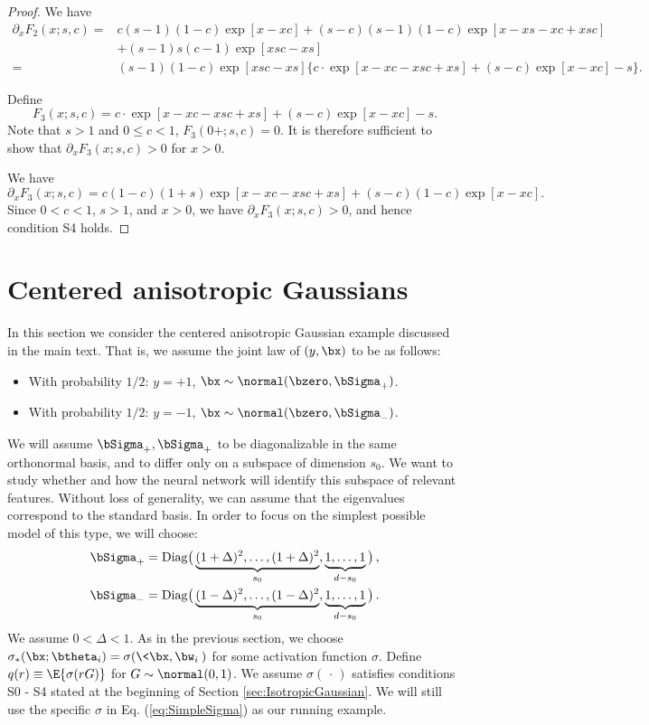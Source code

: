 \documentclass[11pt]{article}
\begin{document}
\begin{proof}
We have 
\[
\begin{aligned}
\partial_x F_2(x; s, c) =& c(s - 1)(1 - c) \exp[x - xc] + (s - c) (s - 1) (1 - c) \exp[x - xs - xc + xsc] \\
&+ (s - 1) s (c - 1) \exp[xsc - xs] \\
=& (s - 1)(1 - c) \exp[xsc - xs] \{c \cdot \exp[x - xc - xsc + xs] + (s - c) \exp[x  - xc] - s  \}. 
\end{aligned}
\]

Define 
\[
F_3(x; s, c) = c \cdot \exp[x - xc - xsc + xs] + (s - c) \exp[x  - xc] - s. 
\]
Note that $s > 1$ and $0 \le c < 1$, $F_3(0 +; s, c) = 0$. It is therefore sufficient to show that $\partial_x F_3(x; s, c) > 0$ for $x > 0$. 

We have
\[
\partial_x F_3(x; s, c) = c(1 - c) (1 + s) \exp[x - xc - xsc + xs]  + (s - c) (1 - c) \exp[x - xc]. 
\]
Since $0 < c < 1$, $s > 1$, and $x > 0$, we have $\partial_x F_3(x; s, c) > 0$, and hence condition {\sf S4} holds. 
\end{proof}



\section{Centered anisotropic Gaussians}\label{sec:AnisotropicGaussian}

In this section we consider the centered anisotropic Gaussian example discussed in the main text. That is, we assume the joint law of $(y,\bx)$ to be as follows: 
%
\begin{itemize}
%
\item[] With probability $1/2$: $y=+1$, $\bx\sim\normal(\bzero,\bSigma_+)$.
%
\item[] With probability $1/2$: $y=-1$, $\bx\sim\normal(\bzero,\bSigma_-)$.
%
\end{itemize}
%
We will assume $\bSigma_+, \bSigma_+$ to be diagonalizable in the same orthonormal basis, and to differ only on a subspace 
of dimension $s_0$. We want to study whether and how the neural network will identify this subspace of relevant features.
Without loss of generality, we can assume that the eigenvalues correspond to the standard basis. In order to focus on the simplest 
possible model of this type, we will choose:
\begin{align}
%
\bSigma_+ &={\rm Diag}\big(\underbrace{(1+\Delta)^2,\dots,(1+\Delta)^2}_{s_0},\underbrace{1,\dots,1}_{d-s_0}\big)\, ,\\
\bSigma_- &={\rm Diag}\big(\underbrace{(1-\Delta)^2,\dots,(1-\Delta)^2}_{s_0},\underbrace{1,\dots,1}_{d-s_0}\big)\, .
%
\end{align}
%
We assume $0 < \Delta < 1$. As in the previous section, we choose $\sigma_*(\bx;\btheta_i) = \sigma(\<\bx,\bw_i\>)$ for some activation function $\sigma$. Define $q(r) \equiv \E\{\sigma(rG)\}$ for $G\sim\normal(0,1)$. We assume $\sigma(\,\cdot\,)$ satisfies conditions {\sf S0} - {\sf S4} stated at the beginning of Section \ref{sec:IsotropicGaussian}. We will still use the specific $\sigma$ in Eq. (\ref{eq:SimpleSigma}) as our running example. 
\end{document}

